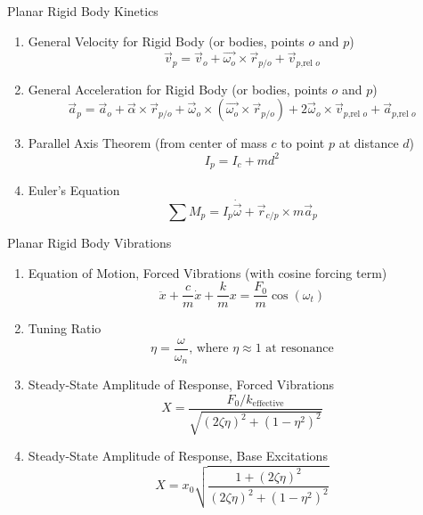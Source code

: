 \begin{multicols*}{2}[]
\vspace{-1em}
Planar Rigid Body Kinetics
\vspace{-1em}
\begin{enumerate}
    \item[] General Velocity for Rigid Body (or bodies, points $o$ and $p$) \[\vec{v}_p = \vec{v}_o + \vec{\omega_o}\times\vec{r}_{p/o} + \vec{v}_{p\text{,rel }o}\]
    \item[] General Acceleration for Rigid Body (or bodies, points $o$ and $p$) \[\vec{a}_p = \vec{a}_o + \vec{\alpha}\times\vec{r}_{p/o}+\vec\omega_o\times(\vec{\omega_o}\times\vec{r}_{p/o}) + 2\vec\omega_o \times \vec{v}_{p\text{,rel }o} + \vec{a}_{p\text{,rel }o}\]
    \item[] Parallel Axis Theorem (from center of mass $c$ to point $p$ at distance $d$) \[I_p = I_c + md^2\]
    \item[] Euler's Equation \[\sum M_p = I_p\dot{\vec{\omega}} + \vec{r}_{c/p}\times m\vec{a}_p\]
\end{enumerate}
\vspace{-1em}
Planar Rigid Body Vibrations
\vspace{-1em}
\begin{enumerate}
    \item[] Equation of Motion, Forced Vibrations (with cosine forcing term) \[\ddot x + \frac{c}{m}\dot x + \frac{k}{m}x = \frac{F_0}{m}\cos(\omega_t)\]
    \item[] Tuning Ratio \[\eta = \frac{\omega}{\omega_n}\text{, where }\eta\approx1 \text{ at resonance}\]
    \item[] Steady-State Amplitude of Response, Forced Vibrations \[X = \frac{F_0/k_\text{effective}}{\sqrt{(2\zeta\eta)^2+(1-\eta^2)^2}}\]
    \item[] Steady-State Amplitude of Response, Base Excitations \[X = x_0\sqrt{\frac{1+(2\zeta\eta)^2}{(2\zeta\eta)^2+(1-\eta^2)^2}}\]
\end{enumerate}
\end{multicols*}